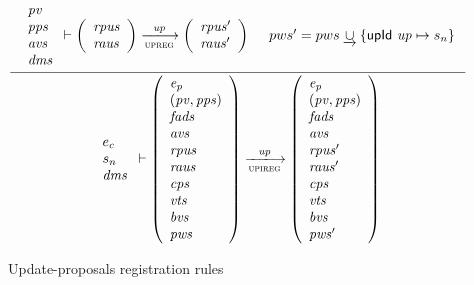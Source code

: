 \begin{figure}[htb]
  \begin{equation}
    \label{eq:rule:upi-reg-interface}
    \inference
    {
      {
        \begin{array}{l}
          \var{pv}\\
          \var{pps}\\
          \var{avs}\\
          \var{dms}
        \end{array}
      }
      \vdash
      {
        \left(
          \begin{array}{l}
            \var{rpus}\\
            \var{raus}
          \end{array}
        \right)
      }
      \trans{upreg}{\var{up}}
      {
        \left(
          \begin{array}{l}
            \var{rpus'}\\
            \var{raus'}
          \end{array}
        \right)
      }
      &
      pws' = pws \unionoverrideRight \{ \upId{up} \mapsto s_n\}
    }
    {
      {
        \begin{array}{l}
          e_c\\
          s_n\\
          \var{dms}
        \end{array}
      }
      \vdash
      {
        \left(
          \begin{array}{l}
            \var{e_p}\\
            (\var{pv}, \var{pps})\\
            \var{fads}\\
            \var{avs}\\
            \var{rpus}\\
            \var{raus}\\
            \var{cps}\\
            \var{vts}\\
            \var{bvs}\\
            \var{pws}
          \end{array}
        \right)
      }
      \trans{upireg}{\var{up}}
      {
        \left(
          \begin{array}{l}
            \var{e_p}\\
            (\var{pv}, \var{pps})\\
            \var{fads}\\
            \var{avs}\\
            \var{rpus'}\\
            \var{raus'}\\
            \var{cps}\\
            \var{vts}\\
            \var{bvs}\\
            \var{pws'}
          \end{array}
        \right)
      }
    }
  \end{equation}
  \caption{Update-proposals registration rules}
  \label{fig:rules:upi-reg-interface}
\end{figure}

